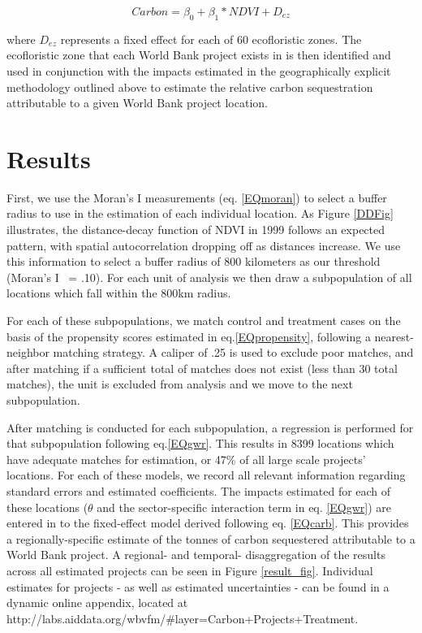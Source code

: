 \documentclass{article}\usepackage[]{graphicx}\usepackage[]{color}
\newenvironment{knitrout}{}{}  %
\begin{document}
\begin{knitrout}
\begin{equation}
Carbon = \beta_{0} + \beta_{1} * NDVI + D_{ez}
\label{EQcarb}
\end{equation}

where \begin{math}D_{ez}\end{math} represents a fixed effect for each of 60 ecofloristic zones.  
The ecofloristic zone that each World Bank project exists in is then identified and used in conjunction with the impacts estimated in the geographically explicit methodology outlined above to estimate the relative carbon sequestration attributable to a given World Bank project location.


\section{Results}
First, we use the Moran's I measurements (eq. \ref{EQmoran}) to select a buffer radius to use in the estimation of each individual location.
As Figure \ref{DDFig} illustrates, the distance-decay function of NDVI in 1999 follows an expected pattern, with spatial autocorrelation dropping off as distances increase.  
We use this information to select a buffer radius of 800 kilometers as our threshold (Moran's I ~= .10).  
For each unit of analysis we then draw a subpopulation of all locations which fall within the 800km radius.
\par
For each of these subpopulations, we match control and treatment cases on the basis of the propensity scores estimated in eq.\ref{EQpropensity}, following a nearest-neighbor matching strategy.  
A caliper of .25 is used to exclude poor matches, and after matching if a sufficient total of matches does not exist (less than 30 total matches), the unit is excluded from analysis and we move to the next subpopulation. 
\par
 
After matching is conducted for each subpopulation, a regression is performed for that subpopulation following eq.\ref{EQgwr}.  
This results in 8399 locations which have adequate matches for estimation, or 47\% of all large scale projects' locations. 
For each of these models, we record all relevant information regarding standard errors and estimated coefficients.  
The impacts estimated for each of these locations (\begin{math}\theta\end{math} and the sector-specific interaction term in eq. \ref{EQgwr}) are entered in to the fixed-effect model derived following eq. \ref{EQcarb}.
This provides a regionally-specific estimate of the tonnes of carbon sequestered attributable to a World Bank project.
A regional- and temporal- disaggregation of the results across all estimated projects can be seen in Figure \ref{result_fig}.  Individual estimates for projects - as well as estimated uncertainties - can be found in a dynamic online appendix, located at http://labs.aiddata.org/wbvfm/\#layer=Carbon+Projects+Treatment. 


\end{knitrout}
\end{document}
